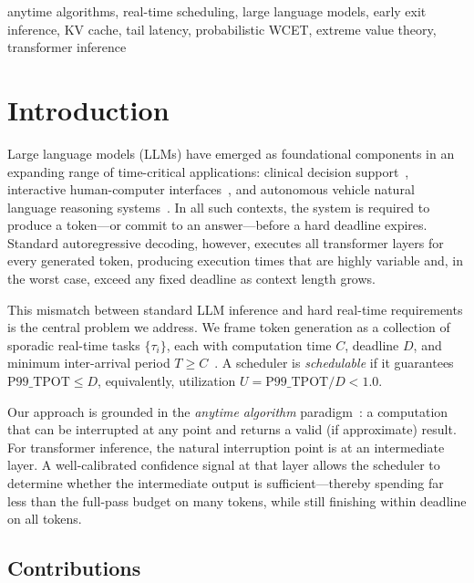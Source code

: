\documentclass[conference]{IEEEtran}
\begin{document}
\begin{IEEEkeywords}
anytime algorithms, real-time scheduling, large language models, early exit inference,
KV cache, tail latency, probabilistic WCET, extreme value theory, transformer inference
\end{IEEEkeywords}

\section{Introduction}

Large language models (LLMs) have emerged as foundational components in an expanding range of time-critical applications: clinical decision support~\cite{singhal2023large}, interactive human-computer interfaces~\cite{ouyang2022training}, and autonomous vehicle natural language reasoning systems~\cite{wen2023dilu}. In all such contexts, the system is required to produce a token---or commit to an answer---before a hard deadline expires. Standard autoregressive decoding, however, executes all transformer layers for every generated token, producing execution times that are highly variable and, in the worst case, exceed any fixed deadline as context length grows.

This mismatch between standard LLM inference and hard real-time requirements is the central problem we address. We frame token generation as a collection of sporadic real-time tasks $\{\tau_i\}$, each with computation time $C$, deadline $D$, and minimum inter-arrival period $T \geq C$~\cite{buttazzo2011hard}. A scheduler is \textit{schedulable} if it guarantees $\text{P99\_TPOT} \leq D$, equivalently, utilization $U = \text{P99\_TPOT}/D < 1.0$.

Our approach is grounded in the \textit{anytime algorithm} paradigm~\cite{boddy1994deliberation,zilberstein1996using}: a computation that can be interrupted at any point and returns a valid (if approximate) result. For transformer inference, the natural interruption point is at an intermediate layer. A well-calibrated confidence signal at that layer allows the scheduler to determine whether the intermediate output is sufficient---thereby spending far less than the full-pass budget on many tokens, while still finishing within deadline on all tokens.

\subsection{Contributions}
\end{document}

